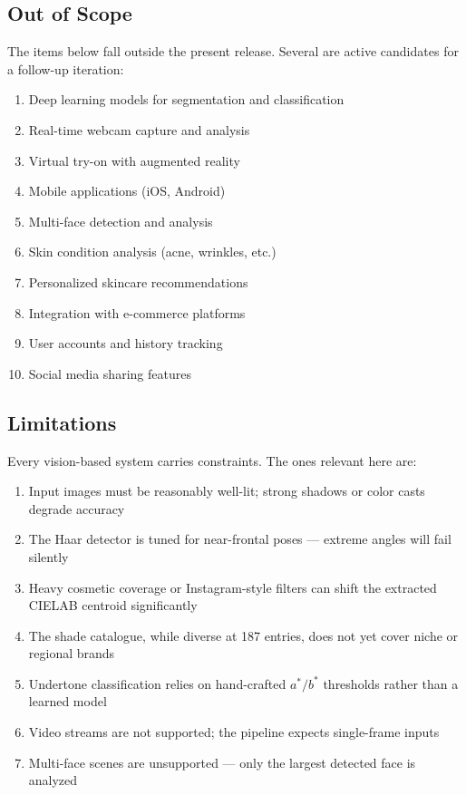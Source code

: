 \subsection{Out of Scope}

The items below fall outside the present release. Several are active candidates for a follow-up iteration:

\begin{enumerate}
    \item Deep learning models for segmentation and classification
    \item Real-time webcam capture and analysis
    \item Virtual try-on with augmented reality
    \item Mobile applications (iOS, Android)
    \item Multi-face detection and analysis
    \item Skin condition analysis (acne, wrinkles, etc.)
    \item Personalized skincare recommendations
    \item Integration with e-commerce platforms
    \item User accounts and history tracking
    \item Social media sharing features
\end{enumerate}

\subsection{Limitations}

Every vision-based system carries constraints. The ones relevant here are:

\begin{enumerate}
    \item Input images must be reasonably well-lit; strong shadows or color casts degrade accuracy
    \item The Haar detector is tuned for near-frontal poses — extreme angles will fail silently
    \item Heavy cosmetic coverage or Instagram-style filters can shift the extracted CIELAB centroid significantly
    \item The shade catalogue, while diverse at 187 entries, does not yet cover niche or regional brands
    \item Undertone classification relies on hand-crafted $a^*/b^*$ thresholds rather than a learned model
    \item Video streams are not supported; the pipeline expects single-frame inputs
    \item Multi-face scenes are unsupported — only the largest detected face is analyzed
\end{enumerate}

